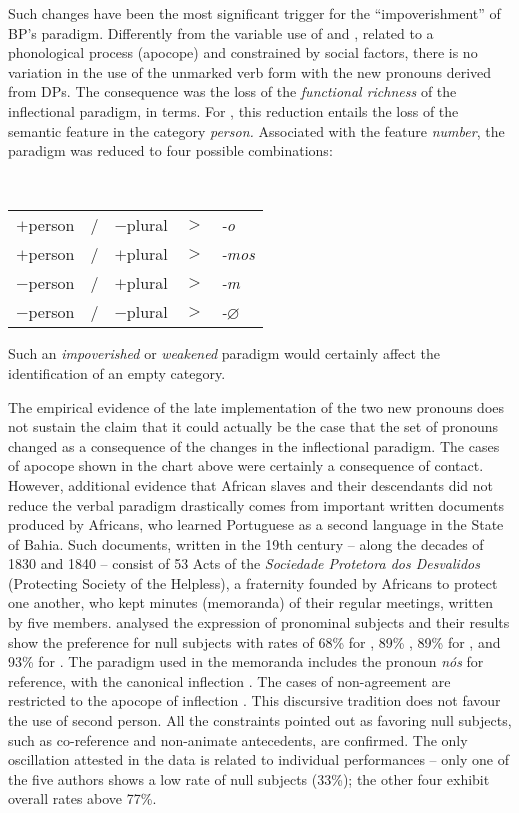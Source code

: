 \documentclass[output=paper]{langsci/langscibook}
\begin{document}
Such changes have been the most significant trigger for the “impoverishment” of
BP’s paradigm. Differently from the variable use of  and , related to a
phonological process (apocope) and constrained by social factors, there is no
variation in the use of the unmarked verb form with the new pronouns derived
from DPs. The consequence was the loss of the \emph{functional richness}
of the inflectional paradigm, in  terms. For
\citet{Galves1993}, this reduction entails the loss of the semantic feature in
the category \emph{person.} Associated with the feature \emph{number}, the
paradigm was reduced to four possible combinations:\newpage

\ea%
    \label{ex:26.5}\leavevmode\\[-1\baselineskip]%
    \begin{tabular}{lllll}
    $+$person & / & $-$plural & $>$ & \emph{-o} \\
    $+$person & / & $+$plural & $>$ & \emph{-mos} \\
    $-$person & / & $+$plural & $>$ & \emph{-m} \\
    $-$person & / & $-$plural & $>$ & \emph{-}$\varnothing$ \\
    \end{tabular}
\z

Such an \emph{impoverished} or \emph{weakened} paradigm would certainly affect
the identification of an empty category.

The empirical evidence of the late implementation of the two new pronouns does
not sustain the claim that it could actually be the case that the set of
pronouns changed as a consequence of the changes in the inflectional paradigm.
The cases of apocope shown in the chart above were certainly a consequence of
contact. However, additional evidence that African slaves and their descendants
did not reduce the verbal paradigm drastically comes from important written
documents produced by Africans, who learned Portuguese as a second language in
the State of Bahia. Such documents, written in the 19th
century – along the decades of 1830 and 1840 – consist of 53 Acts of the
\emph{Sociedade Protetora dos Desvalidos} (Protecting
Society of the Helpless), a fraternity founded by Africans to protect one
another, who kept minutes (memoranda) of their regular meetings, written by
five members. \citet{AlmeidaCarneiro2009} analysed the expression of pronominal
subjects and their results show the preference for null subjects with rates of
68\% for \Fsg{}, 89\% \Fpl{}, 89\% for \Tsg{}, and 93\% for \Tpl{}. The
paradigm used in the memoranda includes the pronoun \emph{nós} for \Fpl{}
reference, with the canonical inflection . The cases of non-agreement are
restricted to the apocope of \Tpl{} inflection . This discursive tradition
does not favour the use of second person. All the constraints pointed out as
favoring null subjects, such as co-reference and non-animate antecedents, are
confirmed. The only oscillation attested in the data is related to individual
performances – only one of the five authors shows a low rate of null subjects
(33\%); the other four exhibit overall rates above 77\%.
\end{document}
